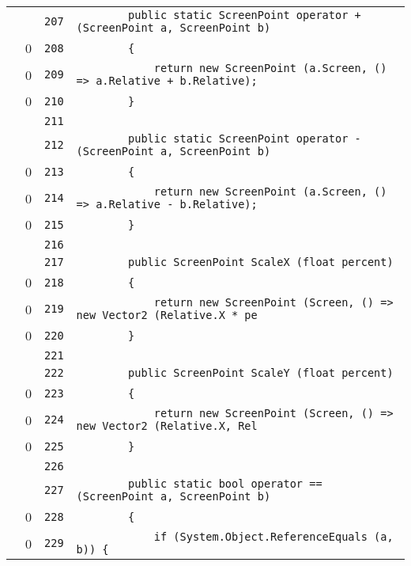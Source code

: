 \documentclass[a4paper,10pt]{article}
\begin{document}
\begin{longtable}[l]{lrrl}
\cellcolor{gray} &  & \verb~207~ & \verb~        public static ScreenPoint operator + (ScreenPoint a, ScreenPoint b)~\\
\cellcolor{red} & 0 & \verb~208~ & \verb~        {~\\
\cellcolor{red} & 0 & \verb~209~ & \verb~            return new ScreenPoint (a.Screen, () => a.Relative + b.Relative);~\\
\cellcolor{red} & 0 & \verb~210~ & \verb~        }~\\
\cellcolor{gray} &  & \verb~211~ & \verb~~\\
\cellcolor{gray} &  & \verb~212~ & \verb~        public static ScreenPoint operator - (ScreenPoint a, ScreenPoint b)~\\
\cellcolor{red} & 0 & \verb~213~ & \verb~        {~\\
\cellcolor{red} & 0 & \verb~214~ & \verb~            return new ScreenPoint (a.Screen, () => a.Relative - b.Relative);~\\
\cellcolor{red} & 0 & \verb~215~ & \verb~        }~\\
\cellcolor{gray} &  & \verb~216~ & \verb~~\\
\cellcolor{gray} &  & \verb~217~ & \verb~        public ScreenPoint ScaleX (float percent)~\\
\cellcolor{red} & 0 & \verb~218~ & \verb~        {~\\
\cellcolor{red} & 0 & \verb~219~ & \verb~            return new ScreenPoint (Screen, () => new Vector2 (Relative.X * pe~\\
\cellcolor{red} & 0 & \verb~220~ & \verb~        }~\\
\cellcolor{gray} &  & \verb~221~ & \verb~~\\
\cellcolor{gray} &  & \verb~222~ & \verb~        public ScreenPoint ScaleY (float percent)~\\
\cellcolor{red} & 0 & \verb~223~ & \verb~        {~\\
\cellcolor{red} & 0 & \verb~224~ & \verb~            return new ScreenPoint (Screen, () => new Vector2 (Relative.X, Rel~\\
\cellcolor{red} & 0 & \verb~225~ & \verb~        }~\\
\cellcolor{gray} &  & \verb~226~ & \verb~~\\
\cellcolor{gray} &  & \verb~227~ & \verb~        public static bool operator == (ScreenPoint a, ScreenPoint b)~\\
\cellcolor{red} & 0 & \verb~228~ & \verb~        {~\\
\cellcolor{red} & 0 & \verb~229~ & \verb~            if (System.Object.ReferenceEquals (a, b)) {~\\

\end{longtable}
\end{document}
